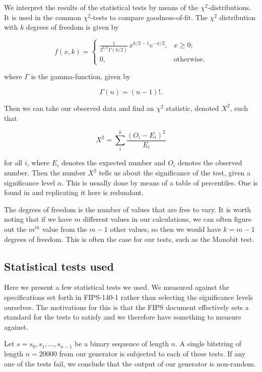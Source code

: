 \documentclass[a4paper]{article}           %
\begin{document}
We interpret the results of the statistical tests by means of the $\chi^2$-distributions. It is used in the common $\chi^2$-tests to compare goodness-of-fit. The $\chi^2$ distribution with $k$ degrees of freedom is given by

\[
f(x, k) =
\begin{cases}
  \frac{1}{2^{k/2}\Gamma(k/2)}\,x^{k/2 - 1} e^{-x/2},  & x \geq 0; \\ 0, & \text{otherwise}.
\end{cases}
\]

where $\Gamma$ is the gamma-function, given by

\[
\Gamma(n) = (n-1)!.
\]

Then we can take our observed data and find an $\chi^2$ statistic, denoted $X^2$, such that

\[
X^2 = \sum_i^k \frac{(O_i - E_i)^2}{E_i}
\]

for all $i$, where $E_i$ denotes the expected number and $O_i$ denotes the observed number. Then the number $X^2$ tells us about the significance of the test, given a significance level $\alpha$. This is usually done by means of a table of percentiles. One is found in \cite[p. 178]{menezes1996} and replicating it here is redundant. 

The degrees of freedom is the number of values that are free to vary. It is worth noting that if we have $m$ different values in our calculations, we can often figure out the $m^{th}$ value from the $m-1$ other values, so then we would have $k=m-1$ degrees of freedom. This is often the case for our tests, such as the Monobit test. 

\subsection{Statistical tests used}

 Here we present a few statistical tests we used. We measured against the specifications set forth in FIPS-140-1\cite{fips140, menezes1996} rather than selecting the significance levels ourselves. The motivations for this is that the FIPS document effectively sets a standard for the tests to satisfy and we therefore have something to measure against. 

Let $s = s_0, s_1, \ldots, s_{n-1}$ be a binary sequence of length $n$. A single bitstring of length $n = 20000$ from our generator is subjected to each of these tests. If any one of the tests fail, we conclude that the output of our generator is non-random. 
\end{document}
